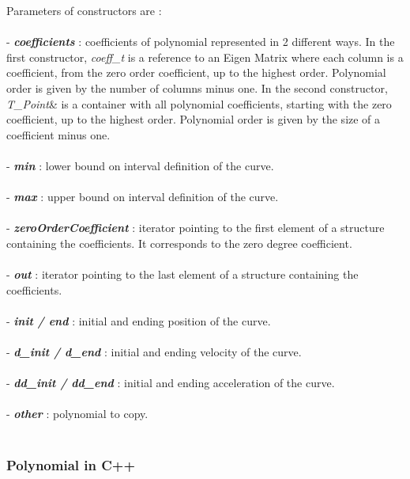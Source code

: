 \documentclass{article}
\begin{document}
    
    Parameters of constructors are :\\\\
    - \textbf{\textit{coefficients}} : coefficients of polynomial represented in 2 different ways. In the first constructor, \textit{coeff\_t} is a reference to an Eigen Matrix where each column is a coefficient, from the zero order coefficient, up to the highest order. Polynomial order is given by the number of columns minus one. In the second constructor, \textit{T\_Point}\& is a container with all polynomial coefficients, starting with the zero coefficient, up to the highest order. Polynomial order is given by the size of a coefficient minus one.\\\\
    - \textbf{\textit{min}} : lower bound on interval definition of the curve.\\\\
    - \textbf{\textit{max}} : upper bound on interval definition of the curve.\\\\
    - \textbf{\textit{zeroOrderCoefficient}} : iterator pointing to the first element of a structure containing the coefficients. It corresponds to the zero degree coefficient.\\\\
    - \textbf{\textit{out}} : iterator pointing to the last element of a structure containing the coefficients.\\\\
    - \textbf{\textit{init / end}} : initial and ending position of the curve.\\\\
    - \textbf{\textit{d\_init / d\_end}} : initial and ending velocity of the curve.\\\\
    - \textbf{\textit{dd\_init / dd\_end}} : initial and ending acceleration of the curve.\\\\
    - \textbf{\textit{other}} : polynomial to copy.\\\\
    
    \subsubsection{Polynomial in C++}
    
\end{document}
